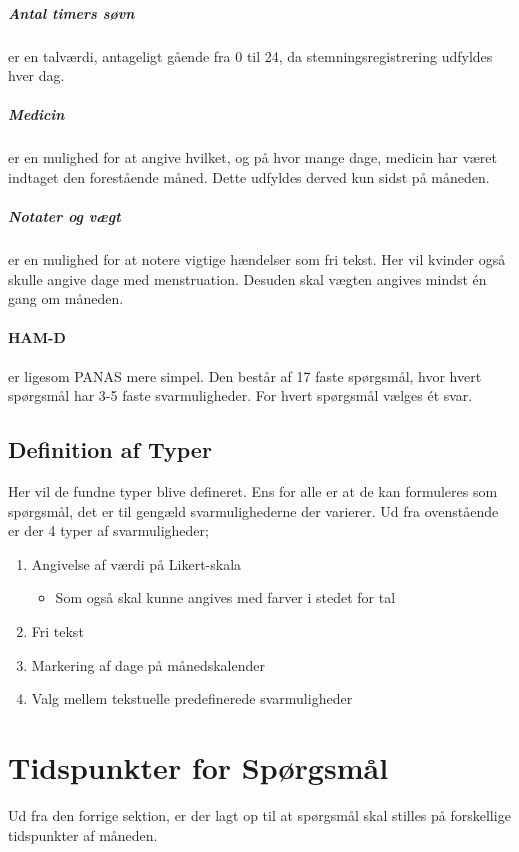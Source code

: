 \subparagraph{Antal timers søvn} er en talværdi, antageligt gående fra 0 til 24, da stemningsregistrering udfyldes hver dag.

\subparagraph{Medicin} er en mulighed for at angive hvilket, og på hvor mange dage, medicin har været indtaget den forestående måned.
Dette udfyldes derved kun sidst på måneden.

\subparagraph{Notater og vægt} er en mulighed for at notere vigtige hændelser som fri tekst.
Her vil kvinder også skulle angive dage med menstruation.
Desuden skal vægten angives mindst én gang om måneden.

\paragraph{HAM-D} er ligesom PANAS mere simpel.
Den består af 17 faste spørgsmål, hvor hvert spørgsmål har 3-5 faste svarmuligheder.
For hvert spørgsmål vælges ét svar.

\subsection{Definition af Typer}\label{krav::typer}
Her vil de fundne typer blive defineret.
Ens for alle er at de kan formuleres som spørgsmål, det er til gengæld svarmulighederne der varierer.
Ud fra ovenstående er der 4 typer af svarmuligheder;

\begin{enumerate}
\item Angivelse af værdi på Likert-skala 
\begin{itemize}
\item Som også skal kunne angives med farver i stedet for tal
\end{itemize}
\item Fri tekst
\item Markering af dage på månedskalender
\item Valg mellem tekstuelle predefinerede svarmuligheder
\end{enumerate}

\section{Tidspunkter for Spørgsmål}
Ud fra den forrige sektion, er der lagt op til at spørgsmål skal stilles på forskellige tidspunkter af måneden.

